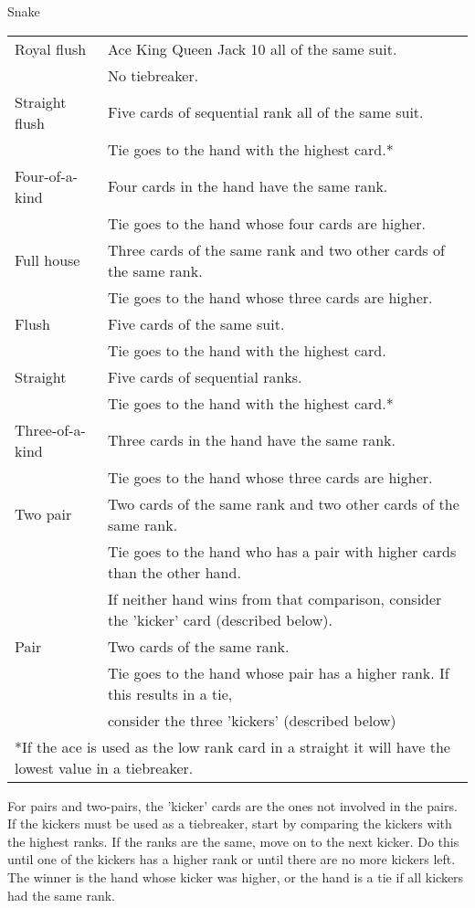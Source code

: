 \begin{problem}{Snake}
\begin{tabular}{|l|l|} 
\hline
 Royal flush & Ace King Queen Jack 10 all of the same suit. \\
  & No tiebreaker. \\ 
 \hline
 Straight flush & Five cards of sequential rank all of the same suit. \\
  & Tie goes to the hand with the highest card.* \\ 
 \hline
 Four-of-a-kind & Four cards in the hand have the same rank. \\
  & Tie goes to the hand whose four cards are higher. \\ 
 \hline
 Full house & Three cards of the same rank and two other cards of the same rank. \\
  & Tie goes to the hand whose three cards are higher. \\ 
 \hline
 Flush & Five cards of the same suit. \\
  & Tie goes to the hand with the highest card. \\ 
 \hline
 Straight & Five cards of sequential ranks. \\ 
  & Tie goes to the hand with the highest card.* \\ 
 \hline
 Three-of-a-kind & Three cards in the hand have the same rank. \\ 
  & Tie goes to the hand whose three cards are higher. \\
 \hline
 Two pair & Two cards of the same rank and two other cards of the same rank. \\ 
  & Tie goes to the hand who has a pair with higher cards than the other hand. \\
  & If neither hand wins from that comparison, consider the 'kicker' card (described below). \\
 \hline
 Pair & Two cards of the same rank. \\ 
  & Tie goes to the hand whose pair has a higher rank. If this results in a tie, \\
  & consider the three 'kickers' (described below) \\
 \hline
 
 \multicolumn{2}{l}{*If the ace is used as the low rank card in a straight it will have the lowest value in a tiebreaker.} \\
\end{tabular}

 For pairs and two-pairs, the 'kicker' cards are the ones not involved in the pairs. If the kickers must be used as a tiebreaker, start by comparing the kickers with the highest ranks. If the ranks are the same, move on to the next kicker. Do this until one of the kickers has a higher rank or until there are no more kickers left. The winner is the hand whose kicker was higher, or the hand is a tie if all kickers had the same rank.
 

\end{problem}
